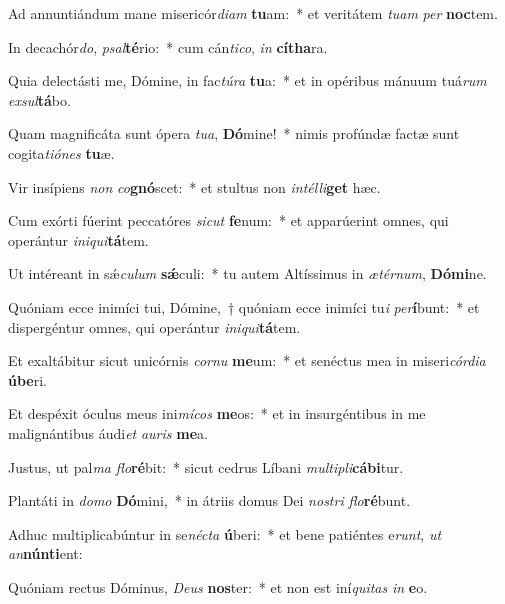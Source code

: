 \item Ad annuntiándum mane misericór\textit{di}\textit{am} \textbf{tu}am:~* et veritátem \textit{tu}\textit{am} \textit{per} \textbf{noc}tem.
\item In decachór\textit{do}, \textit{psal}\textbf{té}rio:~* cum cán\textit{ti}\textit{co}, \textit{in} \textbf{cí}\textbf{tha}ra.
\item Quia delectásti me, Dómine, in fac\textit{tú}\textit{ra} \textbf{tu}a:~* et in opéribus mánuum tuá\textit{rum} \textit{ex}\textit{sul}\textbf{tá}bo.
\item Quam magnificáta sunt ópera \textit{tu}\textit{a}, \textbf{Dó}mine!~* nimis profúndæ factæ sunt cogita\textit{ti}\textit{ó}\textit{nes} \textbf{tu}æ.
\item Vir insípiens \textit{non} \textit{co}\textbf{gnó}scet:~* et stultus non \textit{in}\textit{tél}\textit{li}\textbf{get} hæc.
\item Cum exórti fúerint peccatóres \textit{sic}\textit{ut} \textbf{fe}num:~* et apparúerint omnes, qui operántur \textit{in}\textit{i}\textit{qui}\textbf{tá}tem.
\item Ut intéreant in sǽ\textit{cu}\textit{lum} \textbf{sǽ}culi:~* tu autem Altíssimus in \textit{æ}\textit{tér}\textit{num}, \textbf{Dó}\textbf{mi}ne.
\item Quóniam ecce inimíci tui, Dómine,~† quóniam ecce inimíci tu\textit{i} \textit{per}\textbf{í}bunt:~* et dispergéntur omnes, qui operántur \textit{in}\textit{i}\textit{qui}\textbf{tá}tem.
\item Et exaltábitur sicut unicórnis \textit{cor}\textit{nu} \textbf{me}um:~* et senéctus mea in miseri\textit{cór}\textit{di}\textit{a} \textbf{ú}\textbf{be}ri.
\item Et despéxit óculus meus ini\textit{mí}\textit{cos} \textbf{me}os:~* et in insurgéntibus in me malignántibus áudi\textit{et} \textit{au}\textit{ris} \textbf{me}a.
\item Justus, ut pal\textit{ma} \textit{flo}\textbf{ré}bit:~* sicut cedrus Líbani \textit{mul}\textit{ti}\textit{pli}\textbf{cá}\textbf{bi}tur.
\item Plantáti in \textit{do}\textit{mo} \textbf{Dó}mini,~* in átriis domus Dei \textit{nos}\textit{tri} \textit{flo}\textbf{ré}bunt.
\item Adhuc multiplicabúntur in se\textit{néc}\textit{ta} \textbf{ú}beri:~* et bene patiéntes e\textit{runt}, \textit{ut} \textit{an}\textbf{nún}\textbf{ti}ent:
\item Quóniam rectus Dóminus, \textit{De}\textit{us} \textbf{nos}ter:~* et non est iní\textit{qui}\textit{tas} \textit{in} \textbf{e}o.
